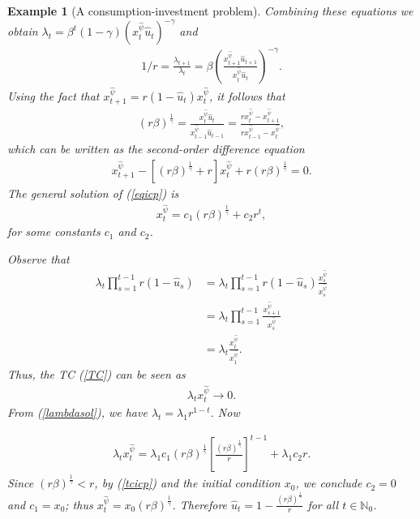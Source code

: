 \documentclass[3p]{elsarticle}
\newcommand{\nat}{\mathbb N_0}
\newtheorem{examp}[thm]{Example}
\begin{document}
\begin{examp}[A consumption-investment problem]
		Combining these equations we obtain
		$\lambda_{t}=\beta^t(1-\gamma)(x_t^{\hat\psi}\hat u_t)^{-\gamma}$ and 
		\begin{align}\label{lambdasol}
		1/r= \frac{\lambda_{t+1}}{\lambda_t}=\beta\left( \frac{x_{t+1}^{\hat\psi} \hat u_{t+1}}{x_t^{\hat\psi} \hat u_t} \right)^{-\gamma}.
		\end{align}
	Using the fact that $x_{t+1}^{\hat\psi}=r(1-\hat u_t)x_t^{\hat\psi}$, it follows that
	\begin{align*}
	(r\beta)^{\frac{1}{\gamma}}=\frac{x_{t}^{\hat\psi}\hat u_{t}}{x_{t-1}^{\hat\psi}\hat u_{t-1}}=\frac{rx_t^{\hat\psi}-x_{t+1}^{\hat\psi}}{rx_{t-1}^{\hat\psi}-x_t^{\hat\psi}},
	\end{align*}
	which can be written as the second-order difference equation
	\begin{align}\label{eqicp}
	x_{t+1}^{\hat\psi}-[(r\beta)^{\frac{1}{\gamma}}+r]x_t^{\hat\psi}+r(r\beta)^{\frac{1}{\gamma}}=0.
	\end{align}
	The general solution of (\ref{eqicp}) is 
	\begin{align*}
	x_t^{\hat\psi}=c_1(r\beta)^{\frac{t}{\gamma}}+c_2r^t,
	\end{align*}
	for some constants $c_1$ and $c_2$.
	
	Observe that 
	\begin{align*}
	\lambda_t\prod_{s=1}^{t-1}r(1-\hat u_s)&=\lambda_t\prod_{s=1}^{t-1}r(1-\hat u_s)\frac{x_s^{\hat\psi}}{x_s^{\hat\psi}}\\
	&=\lambda_t\prod_{s=1}^{t-1}\frac{x_{s+1}^{\hat\psi}}{x_s^{\hat\psi}}\\
	&=\lambda_t\frac{x_t^{\hat\psi}}{x_1^{\hat\psi}}.
	\end{align*}
	Thus, the TC (\ref{TC}) can be seen as
	\begin{align}\label{tcicp}
	\lambda_tx_t^{\hat\psi}\to0.
	\end{align}
	From (\ref{lambdasol}), we have $\lambda_t=\lambda_1r^{1-t}$. Now
	
	\begin{align*}
	\lambda_tx_t^{\hat\psi}=\lambda_1c_1(r\beta)^{\frac{1}{\gamma}}\left[ \frac{(r\beta)^{\frac{1}{\gamma}}}{r}\right]^{t-1}+\lambda_1c_2r.
	\end{align*}
	Since  $\displaystyle (r\beta)^{\frac{1}{\gamma}}<r$, by (\ref{tcicp}) and the initial condition $x_0$, we conclude $c_2=0$ and $c_1=x_0$; thus $x_t^{\hat\psi}=x_0(r\beta)^{\frac{1}{\gamma}}$. Therefore $\hat u_t=1-\displaystyle\frac{(r\beta)^{\frac{1}{\gamma}}}{r}$ for all $t\in\nat$.
		

\end{examp}
\end{document}
